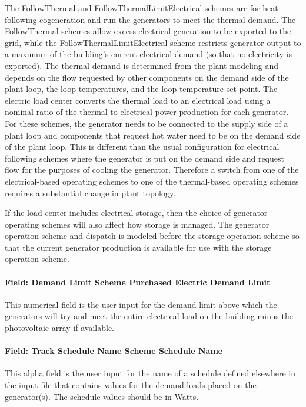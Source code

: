 The FollowThermal and FollowThermalLimitElectrical schemes are for heat following cogeneration and run the generators to meet the thermal demand. The FollowThermal schemes allow excess electrical generation to be exported to the grid, while the FollowThermalLimitElectrical scheme restricts generator output to a maximum of the building's current electrical demand (so that no electricity is exported). The thermal demand is determined from the plant modeling and depends on the flow requested by other components on the demand side of the plant loop, the loop temperatures, and the loop temperature set point. The electric load center converts the thermal load to an electrical load using a nominal ratio of the thermal to electrical power production for each generator. For these schemes, the generator needs to be connected to the supply side of a plant loop and components that request hot water need to be on the demand side of the plant loop. This is different than the usual configuration for electrical following schemes where the generator is put on the demand side and request flow for the purposes of cooling the generator. Therefore a switch from one of the electrical-based operating schemes to one of the thermal-based operating schemes requires a substantial change in plant topology.

If the load center includes electrical storage, then the choice of generator operating schemes will also affect how storage is managed. The generator operation scheme and dispatch is modeled before the storage operation scheme so that the current generator production is available for use with the storage operation scheme.

\paragraph{Field: Demand Limit Scheme Purchased Electric Demand Limit}\label{field-demand-limit-scheme-purchased-electric-demand-limit}

This numerical field is the user input for the demand limit above which the generators will try and meet the entire electrical load on the building minus the photovoltaic array if available.

\paragraph{Field: Track Schedule Name Scheme Schedule Name}\label{field-track-schedule-name-scheme-schedule-name}

This alpha field is the user input for the name of a schedule defined elsewhere in the input file that contains values for the demand loads placed on the generator(s). The schedule values should be in Watts.

